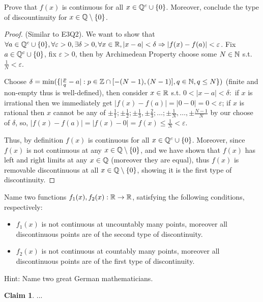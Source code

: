 \documentclass{homework}
\newcommand{\R}{\bb{R}} %
\newcommand{\Q}{\bb{Q}} %
\newcommand{\Z}{\bb{Z}} %
\newcommand{\N}{\bb{N}} %
\newcommand{\Ra}{\Rightarrow}
\newcommand{\?}{\stackrel{?}{=}}
\newcommand{\ep}{\varepsilon}
\theoremstyle{definition}
\newtheorem*{claim}{Claim}
\begin{document}
\question[3] Prove that $f(x)$ is continuous for all $x\in\Q^c\cup\{0\}$. Moreover, conclude the type of discountinuity for $x\in\Q\setminus\{0\}$.

\begin{proof}
    (Similar to E3Q2). We want to show that $\forall a\in\Q^c\cup\{0\},\forall\ep>0,\exists\delta>0,\forall x\in\R, |x-a|<\delta\Ra|f(x)-f(a)|<\ep$. Fix $a\in\Q^c\cup\{0\}$, fix $\ep>0$, then by Archimedean Property choose some $N\in\N$ s.t. $\frac1N<\ep$.

    Choose $\delta=\min(\{|\frac{p}{q}-a|:p\in\Z\cap[-(N-1), (N-1)], q\in\N, q\leq N\})$ (finite and non-empty thus is well-defined), then consider $x\in\R$ s.t. $0<|x-a|<\delta:$ if $x$ is irrational then we immediately get $|f(x)-f(a)|=|0-0|=0<\ep$; if $x$ is rational then $x$ cannot be any of $\pm\frac11; \pm\frac12; \pm\frac13, \pm\frac23; \ldots; \pm\frac1N, \ldots, \pm\frac{N-1}{N}$ by our choose of $\delta$, so, $|f(x)-f(a)|=|f(x)-0|=f(x)\leq\frac1{N}<\ep$.

    Thus, by definition $f(x)$ is continuous for all $x\in\Q^c\cup\{0\}$. Moreover, since $f(x)$ is not continuous at any $x\in\Q\setminus\{0\}$, and we have shown that $f(x)$ has left and right limits at any $x\in\Q$ (moreover they are equal), thus $f(x)$ is removable discontinuous at all $x\in\Q\setminus\{0\}$, showing it is the first type of discontinuity.
\end{proof}

\question[4] Name two functions $f_1(x), f_2(x):\R\to\R$, satisfying the following conditions, respectively:
\begin{itemize}
    \item $f_1(x)$ is not continuous at uncountably many points, moreover all discontinuous points are of the second type of discontinuity.
    \item $f_2(x)$ is not continuous at countably many points, moreover all discontinuous points are of the first type of discontinuity.
\end{itemize}

Hint: Name two great German mathematicians. 

\begin{claim}
    ...
\end{claim}
\end{document}
